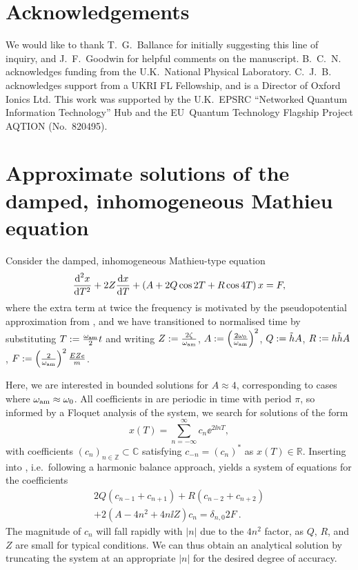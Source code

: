\documentclass[pra,twocolumn]{revtex4-2}
\begin{document}
\section*{Acknowledgements}

We would like to thank T.~G.~Ballance for initially suggesting this line of inquiry, and J.~F.~Goodwin for helpful comments on the manuscript.
B.~C.~N.\, acknowledges funding from the U.K.~National Physical Laboratory.
C.~J.~B.\, acknowledges support from a UKRI FL Fellowship, and is a Director of Oxford Ionics Ltd.
This work was supported by the U.K.~EPSRC \enquote{Networked Quantum Information Technology} Hub and the EU~Quantum Technology Flagship Project AQTION (No.\ 820495).



\clearpage


\appendix


\section{Approximate solutions of the damped, inhomogeneous Mathieu equation}
\label{sec:analytical-mathieu-solns}

Consider the damped, inhomogeneous Mathieu-type equation
\begin{equation}
	\frac{\operatorname{d}^2\!{x}}{\operatorname{d}\!{T}^2} + 2 Z \frac{\operatorname{d}\!{x}}{\operatorname{d}\!{T}} + \left(A + 2 Q \cos 2 T + R \cos 4 T\right) x = F,
	\label{eq:normalised-mathieu}
\end{equation}
where the extra term at twice the frequency is motivated by the pseudopotential approximation from , and we have transitioned to normalised time by substituting $T := \frac{\omega_{\textrm{am}}}{2} t$ and writing $Z := \frac{2 \zeta}{\omega_{\textrm{am}}}$, $A := \left(\frac{2 \omega_{\textrm{0}}}{\omega_{\textrm{am}}}\right)^2$, $Q := \tilde{h} A$, $R := h \tilde{h} A$, $F := \left(\frac{2}{\omega_{\textrm{am}}}\right)^2 \frac{E Z e}{m}$.

Here, we are interested in bounded solutions for $A \approx 4$, corresponding to cases where $\omega_{\textrm{am}} \approx \omega_{\textrm{0}}$.
All coefficients in  are periodic in time with period $\pi$, so informed by a Floquet analysis of the system, we search for solutions of the form
\begin{equation}
	x(T) =\sum_{n = -\infty}^\infty c_n \ee^{2 \ii n T},
	\label{eq:harmonic-ansatz}
\end{equation}
with coefficients $(c_n)_{n \in \mathbb{Z}} \subset \mathbb{C}$ satisfying $c_{-n} = \left(c_n\right)^{*}$ as $x(T) \in \mathbb{R}$.
Inserting  into , i.e.~following a harmonic balance approach, yields a system of equations for the coefficients
\begin{multline*}
	2 Q (c_{n-1} + c_{n+1}) + R (c_{n-2}+c_{n+2}) \\ + 2(A - 4 n^2 + 4 n \ii Z) c_n = \delta_{n,0} 2 F \ .
\end{multline*}
The magnitude of $c_n$ will fall rapidly with $|n|$ due to the $4 n^2$ factor, as $Q$, $R$, and $Z$ are small for typical conditions.
We can thus obtain an analytical solution by truncating the system at an appropriate $|n|$ for the desired degree of accuracy.
\end{document}
